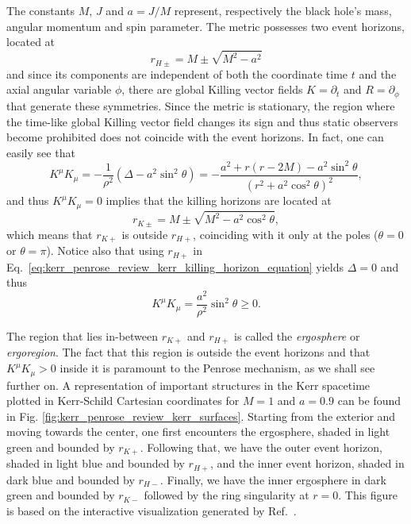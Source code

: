 The constants $M$, $J$ and $a = J/M$ represent, respectively the black hole's mass, angular momentum and spin parameter. The metric possesses two event horizons, located at
%
\begin{equation}
  r_{H\pm} = M \pm \sqrt{M^2 - a^2}
  \label{eq:kerr_penrose_review_kerr_horizons}
\end{equation}
%
and since its components are independent of both the coordinate time $t$ and the axial angular variable $\phi$, there are global Killing vector fields $K = \partial_t$ and $R = \partial_\phi$ that generate these symmetries. Since the metric is stationary, the region where the time-like global Killing vector field changes its sign and thus static observers become prohibited does not coincide with the event horizons. In fact, one can easily see that
%
\begin{equation}
  K^\mu K_\mu = -\frac{1}{\rho^2}\left({\Delta - a^2 \sin^2\theta}\right) = -\frac{a^2 + r(r-2M)-a^2\sin^2\theta}{(r^2+a^2\cos^2\theta)^2},
  \label{eq:kerr_penrose_review_kerr_killing_horizon_equation}
\end{equation}
%
and thus $K^\mu K_\mu = 0$ implies that the killing horizons are located at
%
\begin{equation}
  r_{K\pm} = M \pm \sqrt{M^2 - a^2\cos^2\theta},
  \label{eq:kerr_penrose_review_kerr_killing_horizon_solution}
\end{equation}
%
which means that $r_{K+}$ is outside $r_{H+}$, coinciding with it only at the poles ($\theta=0$ or $\theta=\pi$). Notice also that using $r_{H+}$ in Eq.~\eqref{eq:kerr_penrose_review_kerr_killing_horizon_equation} yields $\Delta=0$ and thus
%
\begin{equation}
  K^\mu K_\mu = \frac{a^2}{\rho^2}\sin^2\theta \geq 0.
  \label{eq:kerr_penrose_review_kerr_killing_horizon_solution_2}
\end{equation}

The region that lies in-between $r_{K+}$ and $r_{H+}$ is called the \emph{ergosphere} or \emph{ergoregion}. The fact that this region is outside the event horizons and that $K^\mu K_\mu>0$ inside it is paramount to the Penrose mechanism, as we shall see further on. A representation of important structures in the Kerr spacetime plotted in Kerr-Schild Cartesian coordinates for $M=1$ and $a=0.9$ can be found in Fig. \ref{fig:kerr_penrose_review_kerr_surfaces}. Starting from the exterior and moving towards the center, one first encounters the ergosphere, shaded in light green and bounded by $r_{K+}$. Following that, we have the outer event horizon, shaded in light blue and bounded by $r_{H+}$, and the inner event horizon, shaded in dark blue and bounded by $r_{H-}$. Finally, we have the inner ergosphere in dark green and bounded by $r_{K-}$ followed by the ring singularity at $r=0$. This figure is based on the interactive visualization generated by Ref.~\cite{KerrSurfaceViz}.

